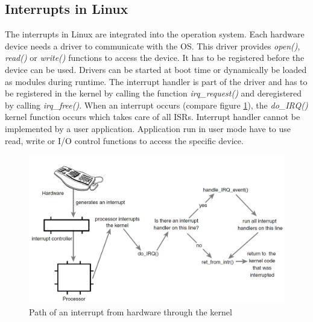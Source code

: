 \subsection{Interrupts in Linux}\label{ss_interrupts_in_linux}
The interrupts in Linux are integrated into the operation system.
Each hardware device needs a driver to communicate with the \ac{OS}.
This driver provides \textit{open()}, \textit{read()} or \textit{write()} functions to access the device. 
It has to be registered before the device can be used.
Drivers can be started at boot time or dynamically be loaded as modules during runtime.
The interrupt handler is part of the driver and has to be registered in the kernel by calling the function \textit{irq\_request()} and deregistered by calling \textit{irq\_free()}.
When an interrupt occurs (compare figure \ref{fig_irq_path_linux}), the \textit{do\_IRQ()} kernel function occurs which takes care of all \acp{ISR}. 
Interrupt handler cannot be implemented by a user application.
Application run in user mode have to use read, write or \ac{I/O} control functions to access the specific device.

\begin{figure}[htb]
	\begin{center}
		\includegraphics[scale=0.3]{inputs/pictures_ch1/irq_path_linux}
	\end{center}
	\caption[Path of an interrupt from hardware through the kernel]{Path of an interrupt from hardware through the kernel \cite{love:lkd}} \label{fig_irq_path_linux}
\end{figure}

